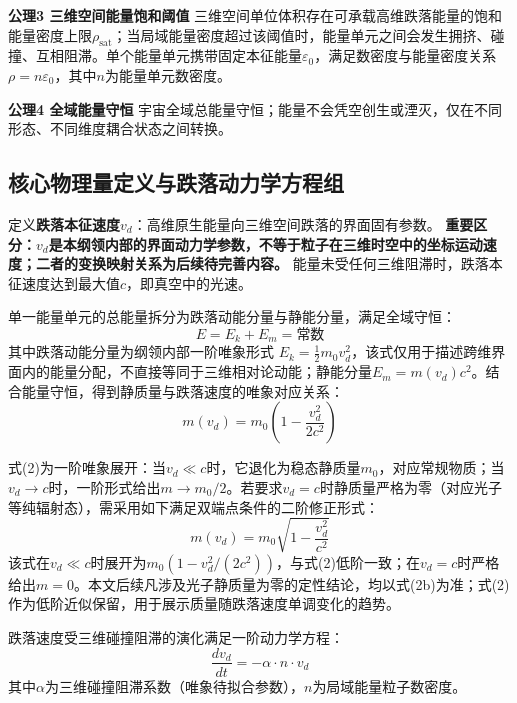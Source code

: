 \documentclass[12pt,a4paper]{ctexart}
\begin{document}
\textbf{公理3 三维空间能量饱和阈值}
三维空间单位体积存在可承载高维跌落能量的饱和能量密度上限$\rho_{\text{sat}}$；当局域能量密度超过该阈值时，能量单元之间会发生拥挤、碰撞、互相阻滞。单个能量单元携带固定本征能量$\varepsilon_0$，满足数密度与能量密度关系$\rho = n \varepsilon_0$，其中$n$为能量单元数密度。

\textbf{公理4 全域能量守恒}
宇宙全域总能量守恒；能量不会凭空创生或湮灭，仅在不同形态、不同维度耦合状态之间转换\cite{noether1918}。

\subsection{核心物理量定义与跌落动力学方程组}
定义\textbf{跌落本征速度}$v_d$：高维原生能量向三维空间跌落的界面固有参数。
\textbf{重要区分：$v_d$是本纲领内部的界面动力学参数，不等于粒子在三维时空中的坐标运动速度；二者的变换映射关系为后续待完善内容。}
能量未受任何三维阻滞时，跌落本征速度达到最大值$c$，即真空中的光速。

单一能量单元的总能量拆分为跌落动能分量与静能分量，满足全域守恒：
\begin{equation}
E = E_k + E_m = \text{常数}
\end{equation}
其中跌落动能分量为纲领内部一阶唯象形式 $E_k = \frac{1}{2} m_0 v_d^2$，该式仅用于描述跨维界面内的能量分配，不直接等同于三维相对论动能；静能分量$E_m = m(v_d) c^2$。结合能量守恒，得到静质量与跌落速度的唯象对应关系：
\begin{equation}
m(v_d) = m_0 \left( 1 - \frac{v_d^2}{2c^2} \right)
\end{equation}

式(2)为一阶唯象展开：当$v_d \ll c$时，它退化为稳态静质量$m_0$，对应常规物质；当$v_d \to c$时，一阶形式给出$m \to m_0/2$。若要求$v_d=c$时静质量严格为零（对应光子等纯辐射态），需采用如下满足双端点条件的二阶修正形式：
\begin{equation*}
m(v_d) = m_0 \sqrt{1 - \frac{v_d^2}{c^2}}
\tag{2b}
\end{equation*}
该式在$v_d \ll c$时展开为$m_0\left(1 - v_d^2/(2c^2)\right)$，与式(2)低阶一致；在$v_d=c$时严格给出$m=0$。本文后续凡涉及光子静质量为零的定性结论，均以式(2b)为准；式(2)作为低阶近似保留，用于展示质量随跌落速度单调变化的趋势。

跌落速度受三维碰撞阻滞的演化满足一阶动力学方程：
\begin{equation}
\frac{dv_d}{dt} = -\alpha \cdot n \cdot v_d
\end{equation}
其中$\alpha$为三维碰撞阻滞系数（唯象待拟合参数），$n$为局域能量粒子数密度。
\end{document}
